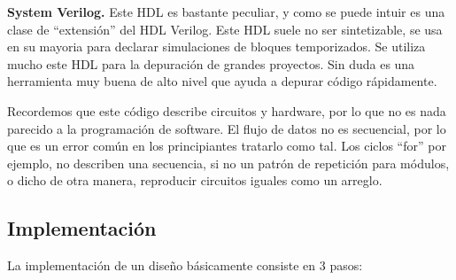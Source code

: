 \documentclass[twoside,spanish,ESP,MSc]{plantillaLabUPV}
\theoremstyle{definition}
\begin{document}

\checkmark\textbf{System Verilog.} Este HDL es bastante peculiar, y como se puede intuir es una clase de ``extensión'' del HDL Verilog. Este HDL suele no ser sintetizable, se usa en su mayoria para declarar simulaciones de bloques temporizados. Se utiliza mucho este HDL para la depuración de grandes proyectos. Sin duda es una herramienta muy buena de alto nivel que ayuda a depurar código rápidamente.





Recordemos que este código describe circuitos y hardware, por lo que no es nada parecido a la programación de software. El flujo de datos no es secuencial, por lo que es un error común en los principiantes tratarlo como tal. Los ciclos ``for'' por ejemplo, no describen una secuencia, si no un patrón de repetición para módulos, o dicho de otra manera, reproducir circuitos iguales como un arreglo.

\subsection{Implementación}%

La implementación de un diseño básicamente consiste en 3 pasos:

%

\end{document}
